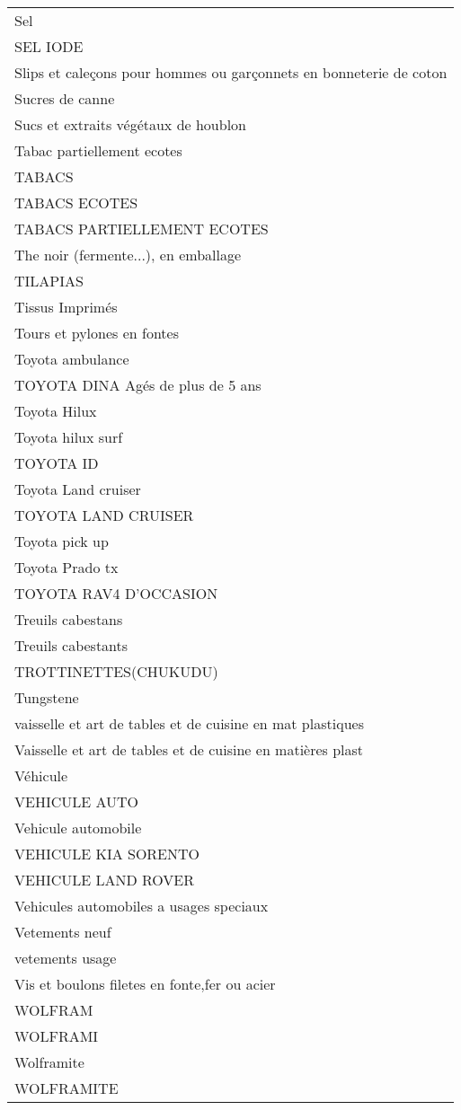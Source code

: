\documentclass[
]{book}
\begin{document}
\begin{longtable}[t]{l}
Sel\\
SEL IODE\\
\addlinespace
Slips et caleçons pour hommes ou garçonnets en bonneterie de coton\\
Sucres de canne\\
Sucs et extraits végétaux de houblon\\
Tabac partiellement ecotes\\
TABACS\\
\addlinespace
TABACS ECOTES\\
TABACS PARTIELLEMENT ECOTES\\
The noir (fermente...), en emballage\\
TILAPIAS\\
Tissus Imprimés\\
\addlinespace
Tours et pylones en fontes\\
Toyota ambulance\\
TOYOTA DINA Agés de plus de 5 ans\\
Toyota Hilux\\
Toyota hilux surf\\
\addlinespace
TOYOTA ID\\
Toyota Land cruiser\\
TOYOTA LAND CRUISER\\
Toyota pick up\\
Toyota Prado tx\\
\addlinespace
TOYOTA RAV4 D'OCCASION\\
Treuils cabestans\\
Treuils cabestants\\
TROTTINETTES(CHUKUDU)\\
Tungstene\\
\addlinespace
vaisselle et art de tables et de cuisine en mat plastiques\\
Vaisselle et art de tables et de cuisine en matières plast\\
Véhicule\\
VEHICULE AUTO\\
Vehicule automobile\\
\addlinespace
VEHICULE KIA SORENTO\\
VEHICULE LAND ROVER\\
Vehicules automobiles a usages speciaux\\
Vetements neuf\\
vetements usage\\
\addlinespace
Vis et boulons filetes en fonte,fer ou acier\\
WOLFRAM\\
WOLFRAMI\\
Wolframite\\
WOLFRAMITE\\
\bottomrule
\end{longtable}
\end{document}
